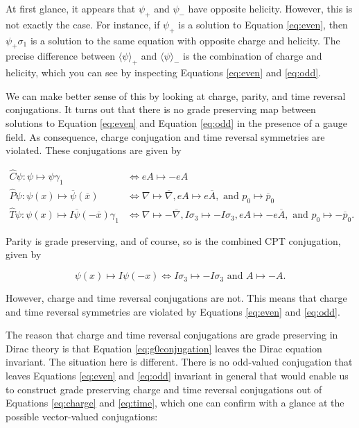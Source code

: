 \documentclass{article}
\begin{document}
  At first glance, it appears that $\psi_+$ and $\psi_-$ have opposite helicity. However, this is not exactly the case. For instance, if $\psi_+$ is a solution to Equation \ref{eq:even}, then $\psi_+ \sigma_1$ is a solution to the same equation with opposite charge and helicity. The precise difference between $\langle \psi \rangle_+$ and $\langle \psi \rangle_-$ is the combination of charge and helicity, which you can see by inspecting Equations \ref{eq:even} and \ref{eq:odd}. 

  We can make better sense of this by looking at charge, parity, and time reversal conjugations. It turns out that there is no grade preserving map between solutions to Equation \ref{eq:even} and Equation \ref{eq:odd} in the presence of a gauge field. As consequence, charge conjugation and time reversal symmetries are violated. These conjugations are given by

  \begin{align}
    \hat C \psi : \psi \mapsto \psi \gamma_1 &\iff eA \mapsto - eA \label{eq:charge}\\
    \hat P \psi : \psi(x) \mapsto \overline \psi(\overline x) &\iff \nabla \mapsto \overline \nabla, eA \mapsto e\overline A, \text{ and } p_0 \mapsto \overline p_0 \label{eq:parity}\\
    \hat T \psi : \psi(x) \mapsto I \overline \psi(-\overline x) \gamma_1 &\iff \nabla \mapsto -\overline\nabla, I\sigma_3 \mapsto - I\sigma_3, eA \mapsto -e\overline A, \text{ and } p_0 \mapsto - \overline p_0.\label{eq:time}
  \end{align}

  Parity is grade preserving, and of course, so is the combined CPT conjugation, given by

  \begin{equation}
    \psi(x) \mapsto I \psi(-x) \iff I \sigma_3 \mapsto - I \sigma_3 \text{ and } A \mapsto - A. \label{eq:cpt}
  \end{equation}

  However, charge and time reversal conjugations are not. This means that charge and time reversal symmetries are violated by Equations \ref{eq:even} and \ref{eq:odd}.

  The reason that charge and time reversal conjugations are grade preserving in Dirac theory is that Equation \ref{eq:g0conjugation} leaves the Dirac equation invariant. The situation here is different. There is no odd-valued conjugation that leaves Equations \ref{eq:even} and \ref{eq:odd} invariant in general that would enable us to construct grade preserving charge and time reversal conjugations out of Equations \ref{eq:charge} and \ref{eq:time}, which one can confirm with a glance at the possible vector-valued conjugations:
\end{document}
